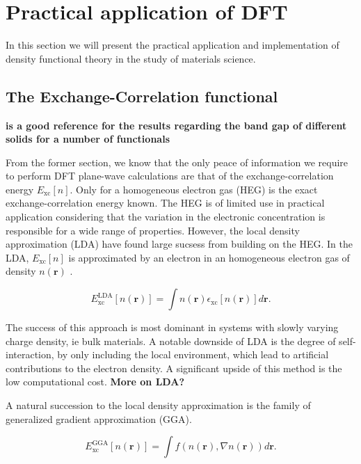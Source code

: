 \chapter{Practical application of DFT}
\label{sec:Practical DFT}

In this section we will present the practical application and implementation of density functional theory in the study of materials science.

\section{The Exchange-Correlation functional}
\textbf{\cite{xc_bandgap} is a good reference for the results regarding the band gap of different solids for a number of functionals}

From the former section, we know that the only peace of information we require to perform DFT plane-wave calculations are that of the exchange-correlation energy $E_{\text{xc}}[n]$. Only for a homogeneous electron gas (HEG) is the exact exchange-correlation energy known. The HEG is of limited use in practical application considering that the variation in the electronic concentration is responsible for a wide range of properties. However, the local density approximation (LDA) have found large sucsess from building on the HEG. In the LDA, $E_{\text{xc}}[n]$ is  approximated by an electron in an homogeneous electron gas of density $n(\boldsymbol{r})$ .  

\begin{equation}
    E_{\text{xc}}^{\text{LDA}}[n(\boldsymbol{r})] = \int n(\boldsymbol{r})\epsilon_{\text{xc}}[n(\boldsymbol{r})]d\boldsymbol{r}.
\end{equation}

The success of this approach is most dominant in systems with slowly varying charge density, ie bulk materials. A notable downside of LDA is the degree of self-interaction, by only including the local environment, which lead to artificial contributions to the electron density. A significant upside of this method is the low computational cost. \textbf{More on LDA?}

A natural succession to the local density approximation is the family of generalized gradient approximation (GGA).  

\begin{equation}
  E_{\text{xc}}^{\text{GGA}}[n(\boldsymbol{r})] = \int f(n(\boldsymbol{r}), \nabla n(\boldsymbol{r}))d\boldsymbol{r}.
\end{equation}

